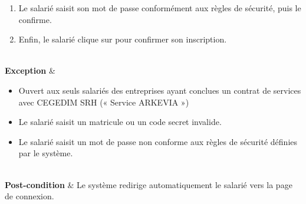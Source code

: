 \begin{longtblr}
\begin{minipage}{\linewidth}
\begin{enumerate}[leftmargin=*]
   \item Le salarié saisit son mot de passe conformément aux règles de sécurité, puis le confirme.
   \item Enfin, le salarié clique sur  pour confirmer son inscription.
\end{enumerate}
\end{minipage}
\\
\textbf{Exception} & \begin{minipage}{\linewidth}
\raggedright
\begin{itemize}[leftmargin=*]
    \item Ouvert aux seuls salariés des entreprises ayant conclues un contrat de services avec CEGEDIM SRH (« Service ARKEVIA »)
    \item Le salarié saisit un matricule ou un code secret invalide.
    \item Le salarié saisit un mot de passe non conforme aux règles de sécurité définies par le système.
\end{itemize}
\end{minipage}
\\
\textbf{Post-condition} & Le système redirige automatiquement le salarié vers la page de connexion.\\
\end{longtblr}
\hfill
\vspace{-1.4cm}
